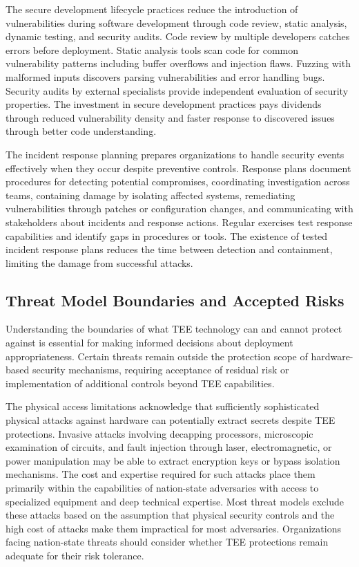 The secure development lifecycle practices reduce the introduction of vulnerabilities during software development through code review, static analysis, dynamic testing, and security audits. Code review by multiple developers catches errors before deployment. Static analysis tools scan code for common vulnerability patterns including buffer overflows and injection flaws. Fuzzing with malformed inputs discovers parsing vulnerabilities and error handling bugs. Security audits by external specialists provide independent evaluation of security properties. The investment in secure development practices pays dividends through reduced vulnerability density and faster response to discovered issues through better code understanding.

The incident response planning prepares organizations to handle security events effectively when they occur despite preventive controls. Response plans document procedures for detecting potential compromises, coordinating investigation across teams, containing damage by isolating affected systems, remediating vulnerabilities through patches or configuration changes, and communicating with stakeholders about incidents and response actions. Regular exercises test response capabilities and identify gaps in procedures or tools. The existence of tested incident response plans reduces the time between detection and containment, limiting the damage from successful attacks.

\subsection{Threat Model Boundaries and Accepted Risks}

Understanding the boundaries of what TEE technology can and cannot protect against is essential for making informed decisions about deployment appropriateness. Certain threats remain outside the protection scope of hardware-based security mechanisms, requiring acceptance of residual risk or implementation of additional controls beyond TEE capabilities.

The physical access limitations acknowledge that sufficiently sophisticated physical attacks against hardware can potentially extract secrets despite TEE protections. Invasive attacks involving decapping processors, microscopic examination of circuits, and fault injection through laser, electromagnetic, or power manipulation may be able to extract encryption keys or bypass isolation mechanisms. The cost and expertise required for such attacks place them primarily within the capabilities of nation-state adversaries with access to specialized equipment and deep technical expertise. Most threat models exclude these attacks based on the assumption that physical security controls and the high cost of attacks make them impractical for most adversaries. Organizations facing nation-state threats should consider whether TEE protections remain adequate for their risk tolerance.

